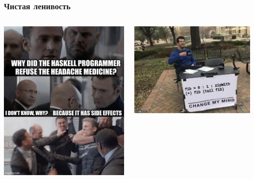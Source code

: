 \documentclass[
    aspectratio=169,
]{beamer}
\begin{document}
\begin{frame}
    \frametitle{Чистая ленивость}

    \begin{columns}[T]
        \begin{column}{0.5\textwidth}
            \includegraphics[width=0.8\linewidth, keepaspectratio]{side-effects.jpeg}
        \end{column}
        \begin{column}{0.5\textwidth}
            \includegraphics[width=\linewidth, keepaspectratio]{lazy.jpg}
        \end{column}
    \end{columns}

\end{frame}
\end{document}
